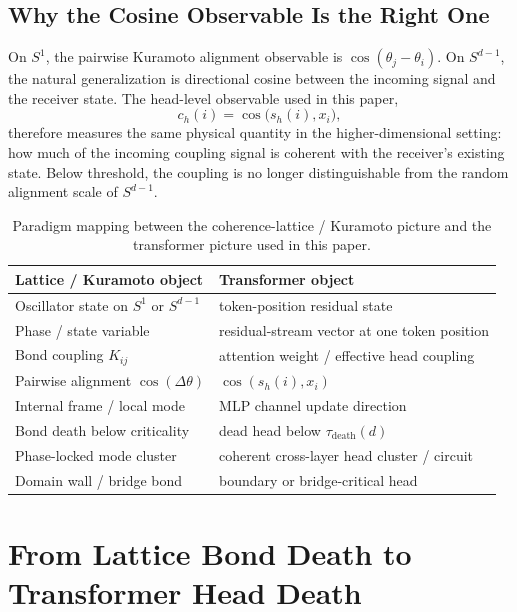 \documentclass[aps,prd,onecolumn,superscriptaddress,showpacs,12pt]{revtex4-2}
\newcommand{\taudeath}{\tau_{\mathrm{death}}}
\begin{document}
\subsection{Why the Cosine Observable Is the Right One}

On $S^1$, the pairwise Kuramoto alignment observable is $\cos(\theta_j-\theta_i)$.
On $S^{d-1}$, the natural generalization is directional cosine between the incoming
signal and the receiver state. The head-level observable used in this paper,
\begin{equation}
c_h(i)=\cos\!\bigl(s_h(i), x_i\bigr),
\end{equation}
therefore measures the same physical quantity in the higher-dimensional setting:
how much of the incoming coupling signal is coherent with the receiver's existing
state. Below threshold, the coupling is no longer distinguishable from the random
alignment scale of $S^{d-1}$.

\begin{table}[t]
\caption{\label{tab:paradigm-map} Paradigm mapping between the coherence-lattice /
Kuramoto picture and the transformer picture used in this paper.}
\begin{tabular}{ll}
\toprule
Lattice / Kuramoto object & Transformer object \\
\midrule
Oscillator state on $S^1$ or $S^{d-1}$ & token-position residual state \\
Phase / state variable & residual-stream vector at one token position \\
Bond coupling $K_{ij}$ & attention weight / effective head coupling \\
Pairwise alignment $\cos(\Delta \theta)$ & $\cos(s_h(i), x_i)$ \\
Internal frame / local mode & MLP channel update direction \\
Bond death below criticality & dead head below $\taudeath(d)$ \\
Phase-locked mode cluster & coherent cross-layer head cluster / circuit \\
Domain wall / bridge bond & boundary or bridge-critical head \\
\bottomrule
\end{tabular}
\end{table}

\section{From Lattice Bond Death to Transformer Head Death}
\end{document}

